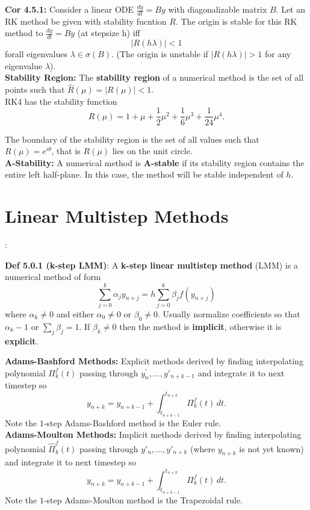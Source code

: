\documentclass[10pt,a4paper]{article}
\begin{document}
\begin{multicols*}{2}
\textbf{Cor 4.5.1:} Consider a linear ODE $\frac{dy}{dt} = By$ with diagonalizable matrix $B$. Let an RK method be given with stability fucntion $R$. The origin is stable for this RK method to $\frac{dy}{dt} = By$ (at stepsize h) iff
\[
|R( h\lambda)| < 1    
\]
forall eigenvalues $\lambda \in \sigma(B)$. (The origin is unstable if $|R( h\lambda)| > 1 $ for any eigenvalue $\lambda$).\\

\textbf{Stability Region:} The \textbf{stability region} of a numerical method is the set of all points such that $\hat R(\mu) = |R(\mu)| < 1$.\\

RK4 has the stability function
\[
R(\mu) = 1 + \mu + \frac{1}{2}\mu^2 + \frac{1}{6}\mu^3 + \frac{1}{24}\mu^4.
\]

The boundary of the stability region is the set of all values such that $R(\mu) = e^{i\theta}$, that is $R(\mu)$ lies on the unit circle.\\

\textbf{A-Stability:} A numerical method is \textbf{A-stable} if its stability region contains the entire left half-plane. In this case, the method will be stable independent of $h$.

\section{Linear Multistep Methods}:

\textbf{Def 5.0.1 (k-step LMM)}: A \textbf{k-step linear multistep method} (LMM) is a numerical method of form
\[
    \sum_{j=0}^k \alpha_j y_{n + j} = h\sum_{j=0}^k \beta_j f(y_{n + j})
\]
where $\alpha_k \neq 0$ and either $\alpha_0 \neq 0 $ or $\beta_0 \neq 0$. Usually normalize coefficients so that $\alpha_k - 1$ or $\sum_j \beta_j = 1$. If $\beta_k \neq 0$ then the method is \textbf{implicit}, otherwise it is \textbf{explicit}. 

\textbf{Adams-Bashford Methods:} Explicit methods derived by finding interpolating polynomial $\Pi_k^f(t)$ passing through $y^\prime_n,...,y\prime_{n+k-1}$ and integrate it to next timestep so 
\[
y_{n+k} = y_{n+k-1} + \int_{t_{n+k-1}}^{t_{n+k}} \Pi_k^f(t)\,dt.
\]
Note the $1$-step Adams-Bashford method is the Euler rule.\\

\textbf{Adams-Moulton Methods:} Implicit methods derived by finding interpolating polynomial $\hat \Pi_k^f(t)$ passing through $y\prime_n,...,y\prime_{n+k}$ (where $y_{n+k}$ is not yet known) and integrate it to next timestep so 
\[
y_{n+k} = y_{n+k-1} + \int_{t_{n+k-1}}^{t_{n+k}} \Pi_k^f(t)\,dt.
\]
Note the $1$-step Adams-Moulton method is the Trapezoidal rule.


\end{multicols*}
\end{document}
